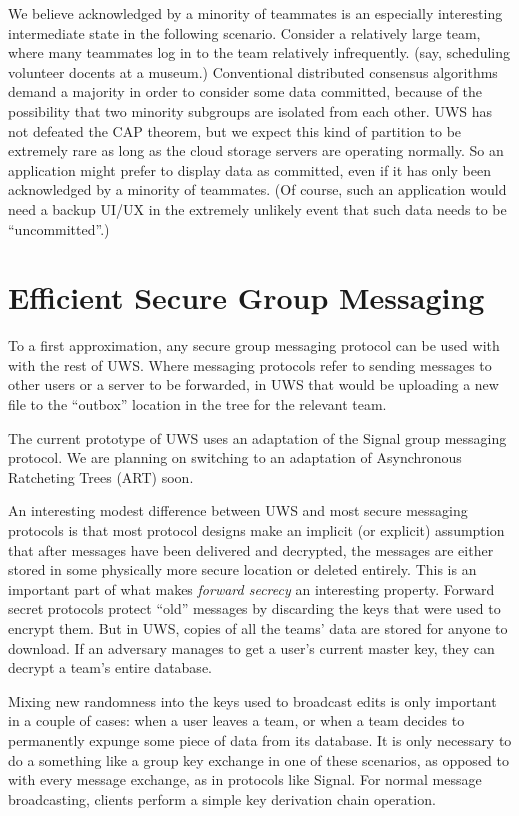 \documentclass[runningheads]{llncs}
\begin{document}
We believe acknowledged by a minority of teammates is an especially interesting intermediate state in the following scenario.
Consider a relatively large team, where many teammates log in to the team relatively infrequently.
(say, scheduling volunteer docents at a museum.)
Conventional distributed consensus algorithms demand a majority in order to consider some data committed, because of the possibility that two minority subgroups are isolated from each other.
UWS has not defeated the CAP theorem, but we expect this kind of partition to be extremely rare as long as the cloud storage servers are operating normally.
So an application might prefer to display data as committed, even if it has only been acknowledged by a minority of teammates.
(Of course, such an application would need a backup UI{\slash}UX in the extremely unlikely event that such data needs to be ``uncommitted''.)


\section{Efficient Secure Group Messaging}

To a first approximation, any secure group messaging protocol can be used with with the rest of UWS.
Where messaging protocols refer to sending messages to other users or a server to be forwarded, in UWS that would be uploading a new file to the ``outbox'' location in the tree for the relevant team.

The current prototype of UWS uses an adaptation of the Signal group messaging protocol.
We are planning on switching to an adaptation of Asynchronous Ratcheting Trees (ART)\cite{Cohn-Gordon2018} soon.

An interesting modest difference between UWS and most secure messaging protocols is that most protocol designs make an implicit (or explicit) assumption that after messages have been delivered and decrypted, the messages are either stored in some physically more secure location or deleted entirely.
This is an important part of what makes \emph{forward secrecy} an interesting property.
Forward secret protocols protect ``old'' messages by discarding the keys that were used to encrypt them.
But in UWS, copies of all the teams' data are stored for anyone to download.
If an adversary manages to get a user's current master key, they can decrypt a team's entire database.

Mixing new randomness into the keys used to broadcast edits is only important in a couple of cases: when a user leaves a team, or when a team decides to permanently expunge some piece of data from its database.
It is only necessary to do a something like a group key exchange in one of these scenarios, as opposed to with every message exchange, as in protocols like Signal.
For normal message broadcasting, clients perform a simple key derivation chain operation.
\end{document}
